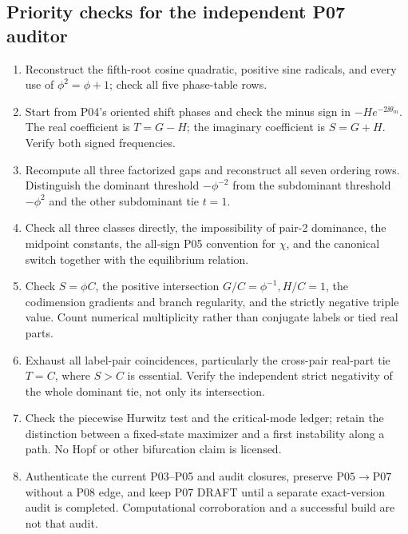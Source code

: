 \subsection{Priority checks for the independent P07 auditor}
\begin{enumerate}[leftmargin=*]
\item Reconstruct the fifth-root cosine quadratic, positive sine radicals,
and every use of $\phi^2=\phi+1$; check all five phase-table rows.
\item Start from P04's oriented shift phases and check the minus sign in
$-He^{-2\ii\theta_m}$. The real coefficient is $T=G-H$; the
imaginary coefficient is $S=G+H$. Verify both signed frequencies.
\item Recompute all three factorized gaps and reconstruct all seven
ordering rows. Distinguish the dominant threshold $-\phi^{-2}$ from
the subdominant threshold $-\phi^2$ and the other subdominant tie $t=1$.
\item Check all three classes directly, the impossibility of pair-2
dominance, the midpoint constants, the all-sign P05 convention for
$\chi$, and the canonical switch together with the equilibrium relation.
\item Check $S=\phi C$, the positive intersection $G/C=\phi^{-1},H/C=1$,
the codimension gradients and branch regularity, and the strictly
negative triple value. Count numerical multiplicity rather than
conjugate labels or tied real parts.
\item Exhaust all label-pair coincidences, particularly the cross-pair
real-part tie $T=C$, where $S>C$ is essential. Verify the independent
strict negativity of the whole dominant tie, not only its intersection.
\item Check the piecewise Hurwitz test and the critical-mode ledger;
retain the distinction between a fixed-state maximizer and a first
instability along a path. No Hopf or other bifurcation claim is licensed.
\item Authenticate the current P03--P05 and audit closures, preserve
$\mathrm{P05}\to\mathrm{P07}$ without a P08 edge, and keep P07 DRAFT
until a separate exact-version audit is completed. Computational
corroboration and a successful build are not that audit.
\end{enumerate}
